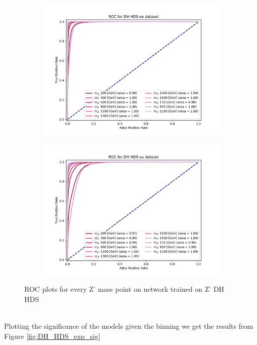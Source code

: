 \documentclass[12pt, a4paper]{book}
\begin{document}
\begin{figure}[!ht]
	\centering
	\begin{subfigure}[b]{0.49\textwidth}
      \centering
      \includegraphics[width=1\textwidth]{XGBoost/DH_HDS/ROC_ee.pdf}
      \end{subfigure}
   \hfill
   \begin{subfigure}[b]{0.49\textwidth}
      \centering
      \includegraphics[width=1\textwidth]{XGBoost/DH_HDS/ROC_uu.pdf}
      \end{subfigure}
   \caption{ROC plots for every Z' mass point on network trained on Z' DH HDS}\label{fig:DH_HDS_ROCS}
\end{figure}
\\Plotting the significance of the models given the binning we get the results from Figure \ref{fig:DH_HDS_exp_sig}
\end{document}
